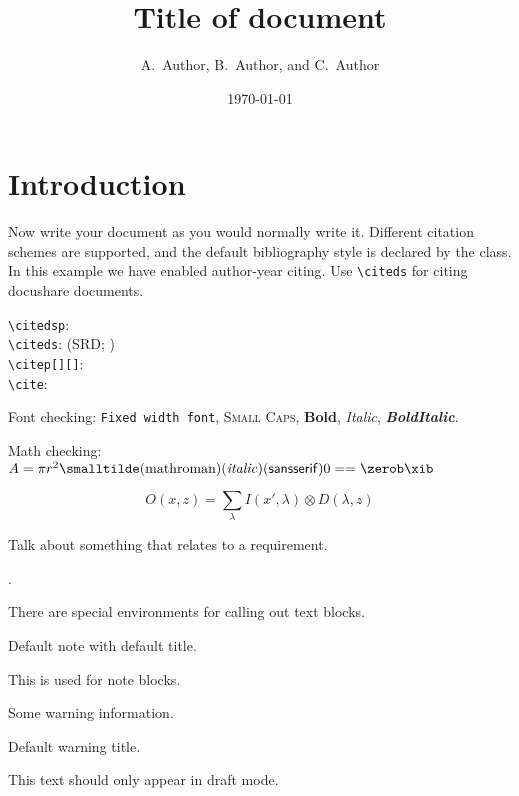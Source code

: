 \documentclass[DM,lsstdraft,authoryear,toc]{lsstdoc}
\title[Short title]{Title of document}
\author{
A.~Author,
B.~Author,
and
C.~Author}
\date{\today}
\begin{document}
\maketitle

\section{Introduction}

Now write your document as you would normally write it.
Different citation schemes are supported, and the default bibliography style is declared by the class.
In this example we have enabled author-year citing.
Use \verb|\citeds| for citing docushare documents.

\verb|\citedsp|:  \\
\verb|\citeds|: (SRD; ) \\
\verb|\citep[][]|: \citep[e.g.,][are interesting]{2009arXiv0912.0201L,2016SPIE.9913E..0GJ} \\
\verb|\cite|: \cite{LPM-51,Wang:2011:QDS:2063348.2063364}

Font checking: \texttt{Fixed width font}, \textsc{Small Caps}, \textbf{Bold}, \textit{Italic}, \textbf{\textit{BoldItalic}}.

Math checking: $A = \pi r^2 \smalltilde\mathrm{(math roman)}\mathit{(italic)}\mathsf{(sans serif)} 0 == \zerob \xib$

\begin{equation}
O(x, z) = \sum_\lambda I(x',\lambda) \otimes D(\lambda, z)
\end{equation}

Talk about something that relates to a requirement.

 .


There are special environments for calling out text blocks.

\begin{note}
  Default note with default title.
\end{note}

\begin{note}
  This is used for note blocks.
\end{note}

\begin{warning}[Scary]
  Some warning information.
\end{warning}

\begin{warning}
  Default warning title.
\end{warning}

\begin{draftnote}
  This text should only appear in draft mode.
\end{draftnote}


\end{document}
